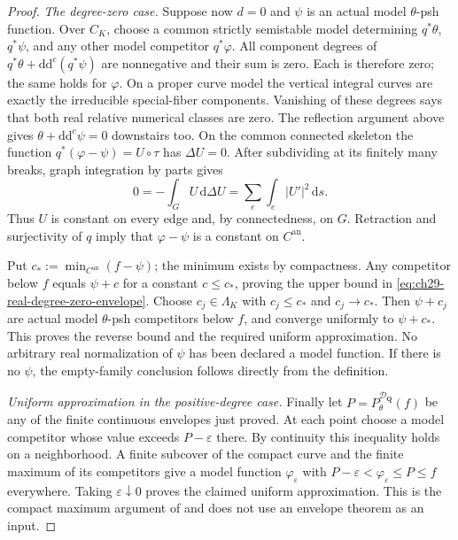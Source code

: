 \begin{proof}
\emph{The degree-zero case.}
Suppose now $d=0$ and $\psi$ is an actual model $\theta$-psh function.
Over $C_K$, choose a common strictly semistable model determining
$q^*\theta$, $q^*\psi$, and any other model competitor $q^*\varphi$.
All component degrees of
$q^*\theta+\mathrm d\mathrm d^c(q^*\psi)$ are nonnegative and their
sum is zero.  Each is therefore zero; the same holds for $\varphi$.
On a proper curve model the vertical integral curves are exactly the
irreducible special-fiber components.  Vanishing of these degrees says
that both real relative numerical classes are zero.
The reflection argument above gives
$\theta+\mathrm d\mathrm d^c\psi=0$ downstairs too.
On the common connected skeleton the function
$q^*(\varphi-\psi)=U\circ\tau$ has $\Delta U=0$.
After subdividing at its finitely many breaks, graph integration by parts
gives
\[
 0=-\int_G U\,\mathrm d\Delta U
   =\sum_e\int_e|U'|^2\,\mathrm ds.
\]
Thus $U$ is constant on every edge and, by connectedness, on $G$.
Retraction and surjectivity of $q$ imply that $\varphi-\psi$ is a
constant on $C^{\mathrm{an}}$.

Put $c_*:=\min_{C^{\mathrm{an}}}(f-\psi)$; the minimum exists by
compactness.  Any competitor below $f$ equals $\psi+c$ for a constant
$c\leq c_*$, proving the upper bound in
\eqref{eq:ch29-real-degree-zero-envelope}.
Choose $c_j\in\Lambda_K$ with $c_j\leq c_*$ and $c_j\to c_*$.
Then $\psi+c_j$ are actual model $\theta$-psh competitors below $f$,
and converge uniformly to $\psi+c_*$.  This proves the reverse bound
and the required uniform approximation.  No arbitrary real normalization
of $\psi$ has been declared a model function.  If there is no $\psi$,
the empty-family conclusion follows directly from the definition.

\emph{Uniform approximation in the positive-degree case.}
Finally let $P=P^{\mathcal D_{\mathbf Q}}_\theta(f)$ be any of the
finite continuous envelopes just proved.  At each point choose a model
competitor whose value exceeds $P-\varepsilon$ there.  By continuity this
inequality holds on a neighborhood.  A finite subcover of the compact
curve and the finite maximum of its competitors give a model function
$\varphi_\varepsilon$ with
$P-\varepsilon<\varphi_\varepsilon\leq P\leq f$ everywhere.
Taking $\varepsilon\downarrow0$ proves the claimed uniform
approximation.  This is the compact maximum argument of
\cite[Proposition~2.9(8)]{GJKM19} and does not use an envelope theorem
as an input.
\end{proof}

